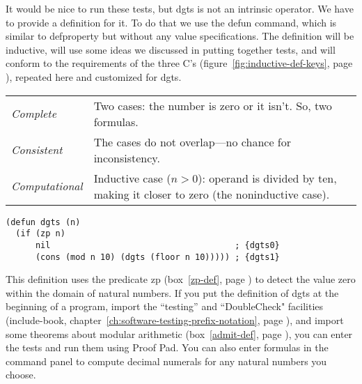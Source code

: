 It would be nice to run these tests, but \textsf{dgts} is not an intrinsic operator.
We have to provide a definition for it.
To do that we use the \textsf{defun} command, which is similar to \textsf{defproperty}
but without any value specifications. The definition will be inductive, will
use some ideas we discussed in putting together tests,
and will conform to the requirements of the three C's
(figure~\ref{fig:inductive-def-keys}, page \pageref{fig:inductive-def-keys}),
repeated here and customized for \textsf{dgts}.
\begin{samepage}
\begin{center}
\begin{tabular}{lp{3.5in}}
\emph{Complete}      & Two cases: the number is zero or it isn't. So, two formulas.\\
\emph{Consistent}    & The cases do not overlap---no chance for inconsistency.\\
\emph{Computational} & Inductive case ($n > 0$): operand is
                       divided by ten, making it closer to zero
                       (the noninductive case).
\end{tabular}
\end{center}
\end{samepage}

\label{dgts-defun}
\begin{code}
\begin{verbatim}
(defun dgts (n)
  (if (zp n)
      nil                                     ; {dgts0}
      (cons (mod n 10) (dgts (floor n 10))))) ; {dgts1}
\end{verbatim}
\end{code}

This definition uses the predicate \textsf{zp}
(box~\ref{zp-def}, page \pageref{zp-def})
to detect the value zero within the domain of natural numbers.
If you put the definition of \textsf{dgts} at the beginning of a program,
import the ``testing'' and ``DoubleCheck" facilities
(\textsf{include-book},
chapter~\ref{ch:software-testing-prefix-notation}, page \pageref{ch:software-testing-prefix-notation}),
and import some theorems about modular arithmetic
(box~\ref{admit-def}, page \pageref{admit-def}),
you can enter the tests and run them using Proof Pad.
You can also enter formulas in the command panel to compute
decimal numerals for any natural numbers you choose.

